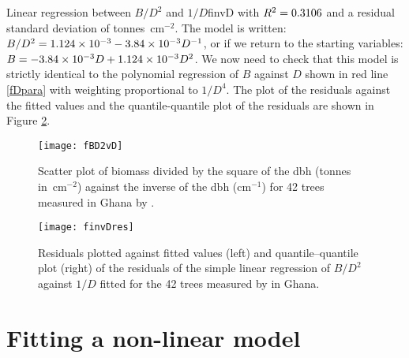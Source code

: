 \begin{filrouge}{Linear regression between $B/D^2$ and $1/D$}{finvD}
%
with $R^2=\mbox{0.3106}$ and a residual standard deviation of  tonnes~cm$^{-2}$. 
The model is written:
$B/D^2=\mbox{1.124}\times10^{-3}-\mbox{3.84}\times10^{-3}D^{-1}$,
or if we return to the starting variables:
$B=-\mbox{3.84}\times10^{-3}D+\mbox{1.124}\times10^{-3}D^2$.
We now need to check that this model is strictly identical to the polynomial regression of $B$ against $D$ shown in red line \ref{fDpara} with weighting proportional to $1/D^4$. The plot of the residuals against the fitted values and the quantile-quantile plot of the residuals are shown in  Figure \ref{finvDres}.
\end{filrouge}

\begin{figure}[htb]
\begin{center}
\texttt{[image: fBD2vD]}
\end{center}
\caption[Scatter plot of biomass divided by the square of the dbh against the inverse of the dbh for 42 trees measured in Ghana by \citet{henry10}]{Scatter plot of biomass divided by the square of the dbh (tonnes in~cm$^{-2}$) against the inverse of the dbh (cm$^{-1}$) for 42 trees measured in Ghana by \citet{henry10}.\label{fBD2vD}}
\end{figure}

\begin{figure}[htb]
\texttt{[image: finvDres]}
\caption[Residuals plotted against fitted values (left) and quantile--quantile plot (right) of the residuals of the simple linear regression of $B/D^2$ against $1/D$ fitted for the 42 trees measured by \citet{henry10} in Ghana]{Residuals plotted against fitted values (left) and quantile--quantile plot (right) of the residuals of the simple linear regression of $B/D^2$ against $1/D$ fitted for the 42 trees measured by \citet{henry10} in Ghana.\label{finvDres}}
\end{figure}

\section{Fitting a non-linear model\label{nlm}}


